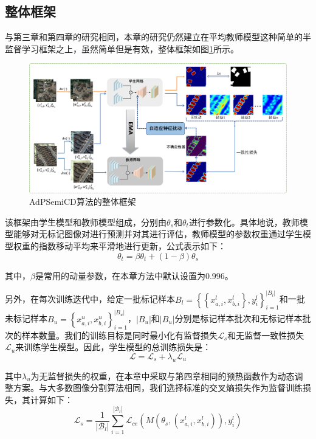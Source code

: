 \documentclass[lang=chs, degree=master, blindreview=false, adobe=false]{yanputhesis}
\begin{document}
\subsection{整体框架}
与第三章和第四章的研究相同，本章的研究仍然建立在平均教师模型这种简单的半监督学习框架之上，虽然简单但是有效，整体框架如图\ref{fig:AdPFrame}所示。
\begin{figure}[htb]
  \centering
  \includegraphics[scale=0.4]{images/AdPFrame.png}
  \caption{
      AdPSemiCD算法的整体框架
  }
  \label{fig:AdPFrame}
\end{figure}

该框架由学生模型和教师模型组成，分别由$\theta_{s}$和$\theta_{t}$进行参数化。具体地说，教师模型能够对无标记图像对进行预测并对其进行评估，教师模型的参数权重通过学生模型权重的指数移动平均来平滑地进行更新，公式表示如下：
\begin{equation}
  \label{eq:AdPema}
  \theta_{t} = \beta \theta_{t}+(1-\beta) \theta_{s}
\end{equation}

其中，$\beta$是常用的动量参数，在本章方法中默认设置为0.996。

另外，在每次训练迭代中，给定一批标记样本$B_{l}=\left\{\left\{x_{a, i}^{l}, x_{b, i}^{l}\right\}, y_{i}^{l}\right\}_{i=1}^{|B_l|}$和一批未标记样本$B_{u}=\left\{x_{a, i}^{u}, x_{b, i}^{u}\right\}_{i=1}^{|B_u|}$，$|B_u|$和$|B_u|$分别是标记样本批次和无标记样本批次的样本数量。我们的训练目标是同时最小化有监督损失$\mathcal{L}_s$和无监督一致性损失$\mathcal{L}_u$来训练学生模型。因此，学生模型的总训练损失是：
\begin{equation}
  \label{eq:AdPLoss}
  \mathcal{L}=\mathcal{L}_{s}+\lambda_{u} \mathcal{L}_{u}
\end{equation}

其中$\lambda_{u}$为无监督损失的权重，在本章中采取与第四章相同的预热函数作为动态调整方案。与大多数图像分割算法相同，我们选择标准的交叉熵损失作为监督训练损失，其计算如下：
\begin{equation}
  \label{eq:AdPLoss_s}
  \mathcal{L}_{s}=\frac{1}{\left|\mathcal{B}_{l}\right|} \sum_{i=1}^{\left|\mathcal{B}_{l}\right|} \mathcal{L}_{ce}\left(M(\theta_s,(x_{a,i}^l,x_{b,i}^l)), y_{i}^{l}\right)
\end{equation}
\end{document}
